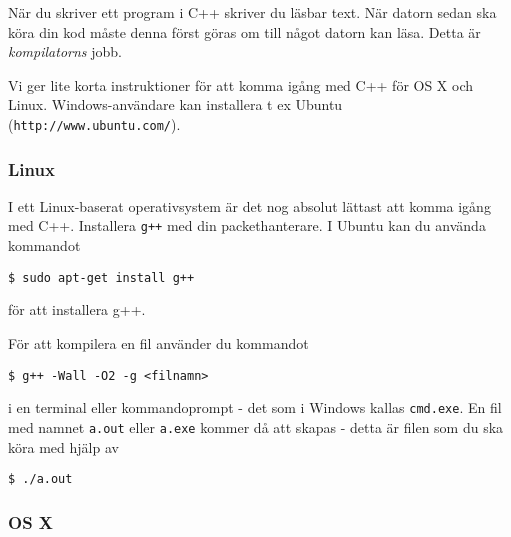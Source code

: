När du skriver ett program i C++ skriver du läsbar text. När datorn sedan ska köra din kod måste denna först göras om till något datorn kan läsa. Detta är \emph{kompilatorns} jobb.

Vi ger lite korta instruktioner för att komma igång med C++ för OS X och Linux. Windows-användare kan installera t ex Ubuntu (\texttt{http://www.ubuntu.com/}).

\subsubsection{Linux}
I ett Linux-baserat operativsystem är det nog absolut lättast att komma igång med C++. Installera \texttt{g++} med din packethanterare. I Ubuntu kan du använda kommandot

\texttt{\$ sudo apt-get install g++}

för att installera g++.

För att kompilera en fil använder du kommandot

\texttt{\$ g++ -Wall -O2 -g <filnamn>}

i en terminal eller kommandoprompt - det som i Windows kallas \texttt{cmd.exe}. En fil med namnet \texttt{a.out} eller \texttt{a.exe} kommer då att skapas - detta är filen som du ska köra med hjälp av

\texttt{\$ ./a.out}


\subsubsection{OS X}

